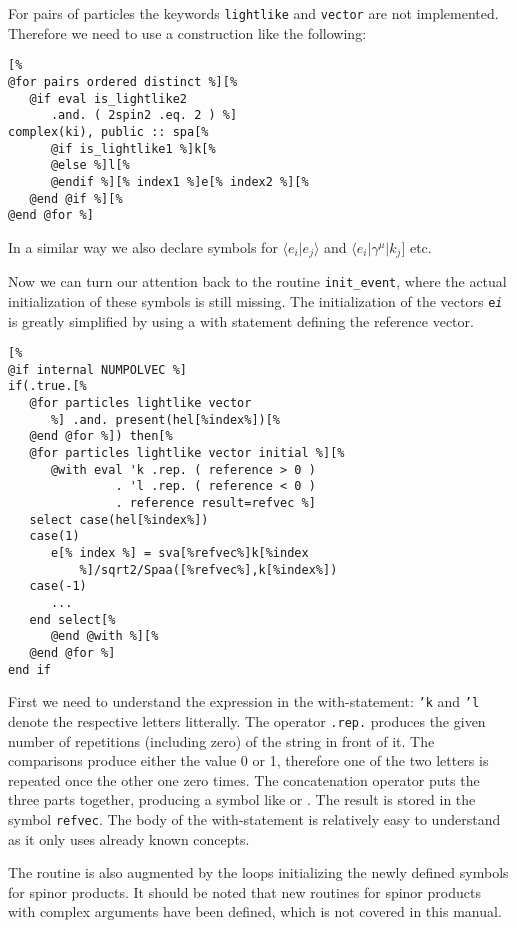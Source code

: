 \documentclass[11pt,a4paper]{refrep}
\begin{document}
For pairs of particles the keywords \texttt{lightlike} and
\texttt{vector} are not implemented. Therefore we need to use
a construction like the following:
\begin{lstlisting}
[%
@for pairs ordered distinct %][%
   @if eval is_lightlike2
      .and. ( 2spin2 .eq. 2 ) %]
complex(ki), public :: spa[%
      @if is_lightlike1 %]k[%
      @else %]l[%
      @endif %][% index1 %]e[% index2 %][%
   @end @if %][%
@end @for %]
\end{lstlisting}
In a similar way we also declare symbols for $\langle e_i\vert e_j\rangle$
and $\langle e_i\vert\gamma^\mu\vert k_j]$ etc.

Now we can turn our attention back to the routine
\texttt{init\hspace{0pt}\_event}, where the actual initialization of
these symbols is still missing. The initialization of the vectors
\texttt{e\it i} is greatly simplified by using a with statement defining
the reference vector.
\begin{lstlisting}
[%
@if internal NUMPOLVEC %]
if(.true.[%
   @for particles lightlike vector
      %] .and. present(hel[%index%])[%
   @end @for %]) then[%
   @for particles lightlike vector initial %][%
      @with eval 'k .rep. ( reference > 0 )
               . 'l .rep. ( reference < 0 )
               . reference result=refvec %]
   select case(hel[%index%])
   case(1)
      e[% index %] = sva[%refvec%]k[%index
          %]/sqrt2/Spaa([%refvec%],k[%index%])
   case(-1)
      ...
   end select[%
      @end @with %][%
   @end @for %]
end if
\end{lstlisting}

First we need to understand the expression in the with-statement:
\texttt{'k} and \texttt{'l} denote the respective letters litterally.
The operator \texttt{.rep.} produces the given number of repetitions
(including zero) of the string in front of it. The comparisons produce
either the value 0 or 1, therefore one of the two letters is repeated
once the other one zero times. The concatenation operator puts the three
parts together, producing a symbol like  or . The
result is stored in the symbol \texttt{refvec}. The body of the with-statement
is relatively easy to understand as it only uses already known concepts.

The routine is also augmented by the loops initializing the newly defined
symbols for spinor products. It should be noted that new routines for spinor
products with complex arguments have been defined, which is not covered
in this manual.
\end{document}
